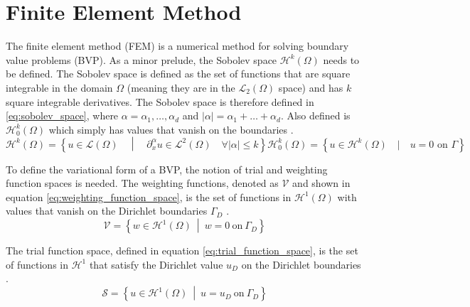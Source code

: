 \section{Finite Element Method}
\label{chap:finite_element_method}
The finite element method (FEM) is a numerical method for solving boundary value problems (BVP). As a minor prelude, the Sobolev space $\mathcal{H}^k(\Omega)$ needs to be defined. The Sobolev space is defined as the set of functions that are square integrable in the domain $\Omega$ (meaning they are in the $\mathcal{L}_2(\Omega)$ space) and has $k$ square integrable derivatives. The Sobolev space is therefore defined in \ref{eq:sobolev_space}, where $\alpha=\alpha_1,\dots,\alpha_d$ and $|\alpha|=\alpha_1+\dots+\alpha_d$. Also defined is $\mathcal{H}_0^k(\Omega)$ which simply has values that vanish on the boundaries \cite{Donea_Huerta_2004}.
\begin{subequations}
	\begin{equation}
		\mathcal{H}^k(\Omega) = \left \{ u\in \mathcal{L}(\Omega) \quad \middle | \quad \partial_x^\alpha u \in \mathcal{L}^2(\Omega) \quad \forall |\alpha|\leq k \right \} 
		\label{eq:sobolev_space}
	\end{equation}
	\begin{equation}
		\mathcal{H}_0^k(\Omega) = \left \{ u\in \mathcal{H}^k(\Omega) \quad | \quad u=0 \text{ on } \Gamma \right \}
	\end{equation}
\end{subequations}

To define the variational form of a BVP, the notion of trial and weighting function spaces is needed. The weighting functions, denoted as $\mathcal{V}$ and shown in equation \ref{eq:weighting_function_space}, is the set of functions in $\mathcal{H}^1(\Omega)$ with values that vanish on the Dirichlet boundaries $\Gamma_D$ \cite{Donea_Huerta_2004}.
\begin{equation}
	\mathcal{V}=\left \{ w\in\mathcal{H}^1(\Omega) \ \middle | \ w = 0 \ \text{on} \ \Gamma_D \right \}
	\label{eq:weighting_function_space}
\end{equation}

The trial function space, defined in equation \ref{eq:trial_function_space}, is the set of functions in $\mathcal{H}^1$ that satisfy the Dirichlet value $u_D$ on the Dirichlet boundaries \cite{Donea_Huerta_2004}. 
\begin{equation}
	\mathcal{S}=\left \{ u\in\mathcal{H}^1(\Omega) \ \middle | \ u = u_D \ \text{on} \ \Gamma_D \right \}
	\label{eq:trial_function_space}
\end{equation}

